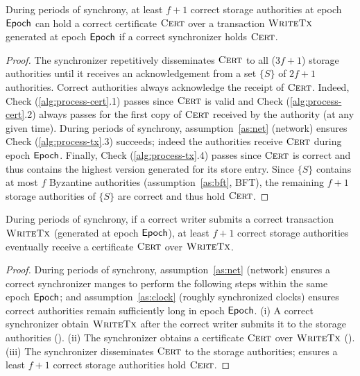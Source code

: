 \begin{lemma}\label{th:authorities-hold-cert}
    During periods of synchrony, at least $f+1$ correct storage authorities at epoch $\textsf{Epoch}$ can hold a correct certificate $\textsc{Cert}$ over a transaction $\textsc{WriteTx}$ generated at epoch $\textsf{Epoch}$ if a correct synchronizer holds $\textsc{Cert}$.
\end{lemma}
\begin{proof}
    The synchronizer repetitively disseminates $\textsc{Cert}$ to all ($3f+1$) storage authorities until it receives an acknowledgement from a set $\{S\}$ of $2f+1$ authorities.
    Correct authorities always acknowledge the receipt of $\textsc{Cert}$. Indeed, Check (\ref{alg:process-cert}.1) passes since $\textsc{Cert}$ is valid and Check (\ref{alg:process-cert}.2) always passes for the first copy of $\textsc{Cert}$ received by the authority (at any given time). During periods of synchrony, assumption~\ref{as:net} (network) ensures Check (\ref{alg:process-tx}.3) succeeds; indeed the authorities receive $\textsc{Cert}$ during epoch $\textsf{Epoch}$. Finally, Check (\ref{alg:process-tx}.4) passes since $\textsc{Cert}$ is correct and thus contains the highest version generated for its store entry.
    Since $\{S\}$ contains at most $f$ Byzantine authorities (assumption~\ref{as:bft}, BFT), the remaining $f+1$ storage authorities of $\{S\}$ are correct and thus hold $\textsc{Cert}$.
\end{proof}

\begin{theorem} \label{th:write-termination}
    During periods of synchrony, if a correct writer submits a correct transaction $\textsc{WriteTx}$ (generated at epoch $\textsf{Epoch}$), at least $f+1$ correct storage authorities eventually receive a certificate $\textsc{Cert}$ over $\textsc{WriteTx}$.
\end{theorem}
\begin{proof}
    During periods of synchrony, assumption~\ref{as:net} (network) ensures a correct synchronizer manges to perform the following steps within the same epoch $\textsf{Epoch}$; and assumption~\ref{as:clock} (roughly synchronized clocks) ensures correct authorities remain sufficiently long in epoch $\textsf{Epoch}$.
    (i) A correct synchronizer obtain $\textsc{WriteTx}$ after the correct writer submits it to the storage authorities ().
    (ii) The synchronizer obtains a certificate $\textsc{Cert}$ over $\textsc{WriteTx}$ ().
    (iii) The synchronizer disseminates $\textsc{Cert}$ to the storage authorities;  ensures a least $f+1$ correct storage authorities hold $\textsc{Cert}$.
\end{proof}

